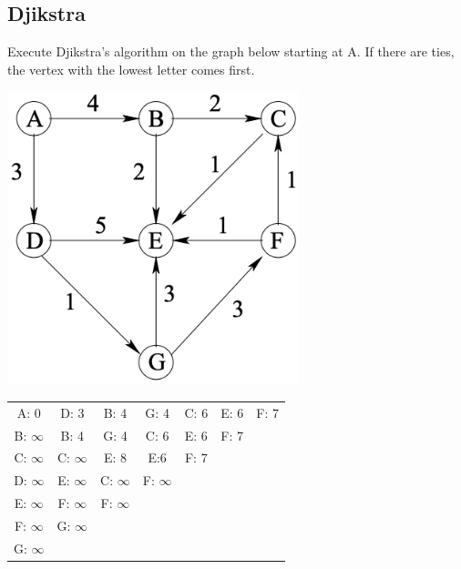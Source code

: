\documentclass{article}
\begin{document}
\begin{multicols*}{2}
    \subsection*{Djikstra}
    Execute Djikstra's algorithm on the graph below starting at A. If there are
    ties, the vertex with the lowest letter comes first.
    \begin{multicols*}{2}
        \includegraphics[width=\columnwidth]{djikstra.png}
        \begin{tabular}{ccccccc}
            A: 0          & D: 3          & B: 4          & G: 4          & C: 6
                          & E: 6          & F: 7                                 \\
            B: \(\infty\) & B: 4          & G: 4          & C: 6          & E: 6
                          & F: 7                                                 \\
            C: \(\infty\) & C: \(\infty\) & E: 8          & E:6           & F: 7
            \\
            D: \(\infty\) & E: \(\infty\) & C: \(\infty\) & F: \(\infty\)
            \\
            E: \(\infty\) & F: \(\infty\) & F: \(\infty\)
            \\
            F: \(\infty\) & G: \(\infty\)
            \\
            G: \(\infty\)
        \end{tabular}


\end{multicols*}
\end{multicols*}
\end{document}
